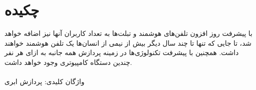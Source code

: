 \thispagestyle{empty}
\chapter*{چکیده}
با پیشرفت روز افزون تلفن‌های هوشمند و تبلت‌ها به تعداد کاربران آنها نیز اضافه خواهد شد، تا جایی که تنها تا چند سال دیگر بیش از نیمی از انسان‌ها یک تلفن هوشمند خواهند داشت. همچنین با پیشرفت تکنولوژی‌ها در زمینه پردازش همه جانبه
به ازای هر نفر چندین دستگاه کامپیوتری وجود خواهد داشت.
\\
\\
\*
واژگان کلیدی: پردازش ابری
